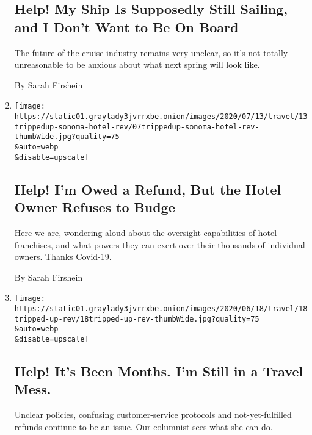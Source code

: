 \begin{enumerate}
  \hypertarget{help-my-ship-is-supposedly-still-sailing-and-i-dont-want-to-be-on-board}{%
  \subsection{Help! My Ship Is Supposedly Still Sailing, and I Don't
  Want to Be On
  Board}\label{help-my-ship-is-supposedly-still-sailing-and-i-dont-want-to-be-on-board}}

  The future of the cruise industry remains very unclear, so it's not
  totally unreasonable to be anxious about what next spring will look
  like.

  By Sarah Firshein
\item
  \href{/2020/07/07/travel/virus-refunds-hotel-franchises.html}{}

  \texttt{[image: https://static01.graylady3jvrrxbe.onion/images/2020/07/13/travel/13trippedup-sonoma-hotel-rev/07trippedup-sonoma-hotel-rev-thumbWide.jpg?quality=75\\\&auto=webp\\\&disable=upscale]}

  \hypertarget{help-im-owed-a-refund-but-the-hotel-owner-refuses-to-budge}{%
  \subsection{Help! I'm Owed a Refund, But the Hotel Owner Refuses to
  Budge}\label{help-im-owed-a-refund-but-the-hotel-owner-refuses-to-budge}}

  Here we are, wondering aloud about the oversight capabilities of hotel
  franchises, and what powers they can exert over their thousands of
  individual owners. Thanks Covid-19.

  By Sarah Firshein
\item
  \href{/2020/06/18/travel/travel-refunds-airlines.html}{}

  \texttt{[image: https://static01.graylady3jvrrxbe.onion/images/2020/06/18/travel/18tripped-up-rev/18tripped-up-rev-thumbWide.jpg?quality=75\\\&auto=webp\\\&disable=upscale]}

  \hypertarget{help-its-been-months-im-still-in-a-travel-mess}{%
  \subsection{Help! It's Been Months. I'm Still in a Travel
  Mess.}\label{help-its-been-months-im-still-in-a-travel-mess}}

  Unclear policies, confusing customer-service protocols and
  not-yet-fulfilled refunds continue to be an issue. Our columnist sees
  what she can do.


\end{enumerate}
